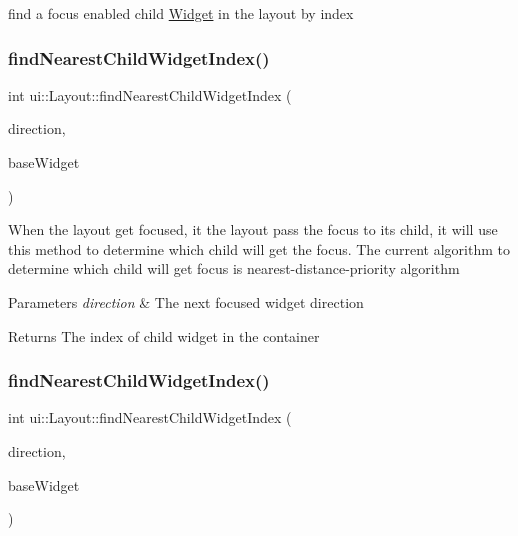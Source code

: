 find a focus enabled child \hyperlink{classui_1_1Widget}{Widget} in the layout by index \mbox{\label{classui_1_1Layout_a522d31325af855e6a5a7ed38f1878a9b}} 
\subsubsection{\texorpdfstring{find\+Nearest\+Child\+Widget\+Index()}{findNearestChildWidgetIndex()}\hspace{0.1cm}{\footnotesize\ttfamily [1/2]}}
{\footnotesize\ttfamily int ui\+::\+Layout\+::find\+Nearest\+Child\+Widget\+Index (\begin{DoxyParamCaption}\item[{\hyperlink{classui_1_1Widget_a8ae8e8fc793a04a87584205cd1e8a8a5}{Focus\+Direction}}]{direction,  }\item[{\hyperlink{classui_1_1Widget}{Widget} $\ast$}]{base\+Widget }\end{DoxyParamCaption})\hspace{0.3cm}{\ttfamily [protected]}}

When the layout get focused, it the layout pass the focus to its child, it will use this method to determine which child will get the focus. The current algorithm to determine which child will get focus is nearest-\/distance-\/priority algorithm 
\begin{DoxyParams}{Parameters}
{\em direction} & The next focused widget direction \\
\hline
\end{DoxyParams}
\begin{DoxyReturn}{Returns}
The index of child widget in the container 
\end{DoxyReturn}
\mbox{\label{classui_1_1Layout_a522d31325af855e6a5a7ed38f1878a9b}} 
\subsubsection{\texorpdfstring{find\+Nearest\+Child\+Widget\+Index()}{findNearestChildWidgetIndex()}\hspace{0.1cm}{\footnotesize\ttfamily [2/2]}}
{\footnotesize\ttfamily int ui\+::\+Layout\+::find\+Nearest\+Child\+Widget\+Index (\begin{DoxyParamCaption}\item[{\hyperlink{classui_1_1Widget_a8ae8e8fc793a04a87584205cd1e8a8a5}{Focus\+Direction}}]{direction,  }\item[{\hyperlink{classui_1_1Widget}{Widget} $\ast$}]{base\+Widget }\end{DoxyParamCaption})\hspace{0.3cm}{\ttfamily [protected]}}

